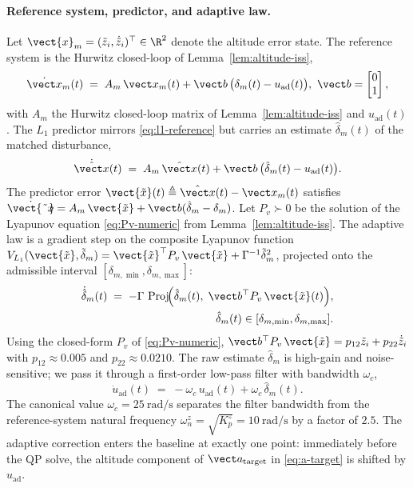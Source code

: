 \paragraph{Reference system, predictor, and adaptive law.} Let $\vect{x}_m = (\tilde z_i, \dot{\tilde z}_i)^\top \in \R^2$ denote the altitude error state. The reference system is the
Hurwitz closed-loop of Lemma~\ref{lem:altitude-iss},
\begin{align}
\label{eq:l1-reference}
  \dot{\vect x}_m(t) \;=\; A_m\,\vect x_m(t)
    + \vect b\,\bigl(\delta_m(t) - u_{\mathrm{ad}}(t)\bigr),~
  \vect b = \begin{bmatrix}0 \\ 1\end{bmatrix},
\end{align}
with $A_m$ the Hurwitz closed-loop matrix of Lemma~\ref{lem:altitude-iss} and $u_{\mathrm{ad}}(t)$. The $L_1$ predictor mirrors \eqref{eq:l1-reference} but carries an estimate $\hat\delta_m(t)$ of the matched disturbance,
\begin{equation}
  \dot{\hat{\vect x}}(t) \;=\;
    A_m\,\hat{\vect x}(t)
    + \vect b\,\bigl(\hat\delta_m(t) - u_{\mathrm{ad}}(t)\bigr).
  \label{eq:l1-predictor}
\end{equation}
The predictor error $\vect{\tilde x}(t) \triangleq \hat{\vect x}(t) - \vect x_m(t)$ satisfies $\dot{\vect{\tilde x}}  = A_m\,\vect{\tilde x} + \vect b(\hat\delta_m - \delta_m)$. Let $P_v \succ 0$ be the solution of the Lyapunov equation \eqref{eq:Pv-numeric} from Lemma~\ref{lem:altitude-iss}. The adaptive law is a gradient step on the composite Lyapunov function
$V_{L_1}(\vect{\tilde x}, \tilde\delta_m) = \vect{\tilde x}^\top P_v\,\vect{\tilde x}  + \Gamma^{-1}\tilde\delta_m^2$, projected onto the admissible interval $[\delta_{m,\min}, \delta_{m,\max}]$:
\begin{align}
\label{eq:l1-adaptive}
  \dot{\hat{\delta}}_{m}(t)
    \;=\; -\Gamma\,\operatorname{Proj}\!\Bigl(
      \hat\delta_m(t),\;
      \vect b^\top P_v\,\vect{\tilde x}(t)
    \Bigr),\\
  \hat\delta_m(t) \in [\delta_{m,\min}, \delta_{m,\max}].\nonumber
\end{align}
Using the closed-form $P_v$ of \eqref{eq:Pv-numeric}, $\vect b^\top P_v\,\vect{\tilde x}
= p_{12}\tilde z_i + p_{22}\dot{\tilde z}_i$ with $p_{12} \approx 0.005$ and $p_{22} \approx 0.0210$. The raw estimate $\hat\delta_m$ is high-gain and noise-sensitive; we pass it through a first-order low-pass filter with bandwidth $\omega_c$,
\begin{equation}
  \dot u_{\mathrm{ad}}(t) \;=\;
    -\omega_c\,u_{\mathrm{ad}}(t)
    + \omega_c\,\hat\delta_m(t).
  \label{eq:l1-lpf}
\end{equation}
The canonical value $\omega_c = \SI{25}{\radian\per\second}$ separates the filter
bandwidth from the reference-system natural frequency $\omega_n^z = \sqrt{K_p^z} = \SI{10}{\radian\per\second}$ by a factor of $2.5$. The adaptive correction enters the baseline at
exactly one point: immediately before the QP solve, the altitude component of $\vect a_{\mathrm{target}}$ in \eqref{eq:a-target} is shifted by $u_{\mathrm{ad}}$.

